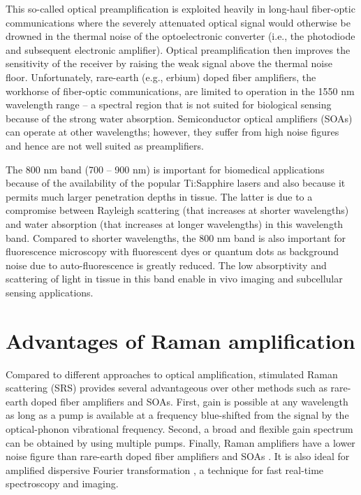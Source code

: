 This so-called optical preamplification is exploited heavily in long-haul fiber-optic communications \cite{islam2002raman} where the severely attenuated optical signal would otherwise be drowned in the thermal noise of the optoelectronic converter (i.e., the photodiode and subsequent electronic amplifier). Optical preamplification then improves the sensitivity of the receiver by raising the weak signal above the thermal noise floor. Unfortunately, rare-earth (e.g., erbium) doped fiber amplifiers, the workhorse of fiber-optic communications, are limited to operation in the 1550 nm wavelength range -- a spectral region that is not suited for biological sensing because of the strong water absorption. Semiconductor optical amplifiers (SOAs) can operate at other wavelengths; however, they suffer from high noise figures and hence are not well suited as preamplifiers. 

The 800 nm band (700 -- 900 nm) is important for biomedical applications because of the availability of the popular Ti:Sapphire lasers and also because it permits much larger penetration depths in tissue. The latter is due to a compromise between Rayleigh scattering (that increases at shorter wavelengths) and water absorption (that increases at longer wavelengths) in this wavelength band. Compared to shorter wavelengths, the 800 nm band is also important for fluorescence microscopy with fluorescent dyes or quantum dots as background noise due to auto-fluorescence is greatly reduced. The low absorptivity and scattering of light in tissue in this band enable in vivo imaging and subcellular sensing applications.

\section{Advantages of Raman amplification}

Compared to different approaches to optical amplification, stimulated Raman scattering (SRS) \cite{islam2002raman} provides several advantageous over other methods such as rare-earth doped fiber amplifiers and SOAs. First, gain is possible at any wavelength as long as a pump is available at a frequency blue-shifted from the signal by the optical-phonon vibrational frequency. Second, a broad and flexible gain spectrum can be obtained by using multiple pumps. Finally, Raman amplifiers have a lower noise figure than rare-earth doped fiber amplifiers and SOAs \cite{islam2002raman}. It is also ideal for amplified dispersive Fourier transformation \cite{goda2009serial,goda2008amplified,goda2009theory}, a technique for fast real-time spectroscopy and imaging. 

